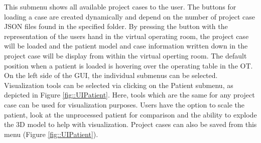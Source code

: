 This submenu shows all available project cases to the user.
The buttons for loading a case are created dynamically and depend on the number of project case JSON files found in the specified folder.
By pressing the button with the representation of the users hand in the virtual operating room, the project case will be loaded and the patient model and case information written down in the project case will be display from within the virtual operting room.
The default position when a patient is loaded is hovering over the operating table in the OT.
On the left side of the GUI, the individual submenus can be selected.
Visualization tools can be selected via clicking on the Patient submenu, as depicted in Figure \ref{fig::UIPatient}.
Here, tools which are the same for any project case can be used for visualization purposes.
Users have the option to scale the patient, look at the unprocessed patient for comparison and the ability to explode the 3D model to help with visualization.
Project cases can also be saved from this menu (Figure \ref{fig::UIPatient}).

